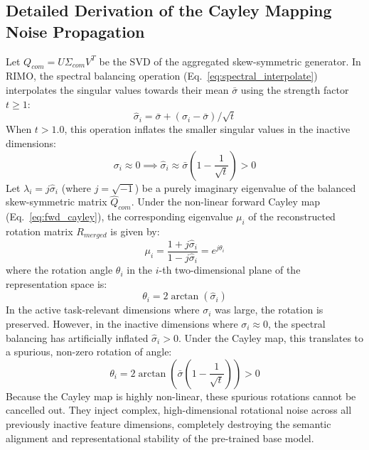 \subsection{Detailed Derivation of the Cayley Mapping Noise Propagation}
\label{deriv:noise_prop}
Let $Q_{com} = U \Sigma_{com} V^T$ be the SVD of the aggregated skew-symmetric generator. In RIMO, the spectral balancing operation (Eq.~\ref{eq:spectral_interpolate}) interpolates the singular values towards their mean $\bar{\sigma}$ using the strength factor $t \ge 1$:
\begin{equation}
\hat{\sigma}_i = \bar{\sigma} + (\sigma_i - \bar{\sigma}) / \sqrt{t}
\end{equation}
When $t > 1.0$, this operation inflates the smaller singular values in the inactive dimensions:
\begin{equation}
\sigma_i \approx 0 \implies \hat{\sigma}_i \approx \bar{\sigma} \left(1 - \frac{1}{\sqrt{t}}\right) > 0
\end{equation}
Let $\lambda_i = j \hat{\sigma}_i$ (where $j = \sqrt{-1}$) be a purely imaginary eigenvalue of the balanced skew-symmetric matrix $\hat{Q}_{com}$. Under the non-linear forward Cayley map (Eq.~\ref{eq:fwd_cayley}), the corresponding eigenvalue $\mu_i$ of the reconstructed rotation matrix $R_{merged}$ is given by:
\begin{equation}
\mu_i = \frac{1 + j \hat{\sigma}_i}{1 - j \hat{\sigma}_i} = e^{j \theta_i}
\end{equation}
where the rotation angle $\theta_i$ in the $i$-th two-dimensional plane of the representation space is:
\begin{equation}
\theta_i = 2 \arctan(\hat{\sigma}_i)
\end{equation}
In the active task-relevant dimensions where $\sigma_i$ was large, the rotation is preserved. However, in the inactive dimensions where $\sigma_i \approx 0$, the spectral balancing has artificially inflated $\hat{\sigma}_i > 0$. Under the Cayley map, this translates to a spurious, non-zero rotation of angle:
\begin{equation}
\theta_i = 2 \arctan\left( \bar{\sigma} \left(1 - \frac{1}{\sqrt{t}}\right) \right) > 0
\end{equation}
Because the Cayley map is highly non-linear, these spurious rotations cannot be cancelled out. They inject complex, high-dimensional rotational noise across all previously inactive feature dimensions, completely destroying the semantic alignment and representational stability of the pre-trained base model.

